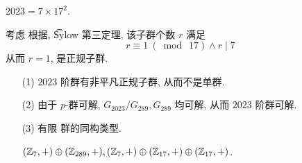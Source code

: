 \problem[题目 6]

\begin{solution}
	$2023=7\times 17^2$.

	考虑 \Sy[17] 根据, \t{Sylow} 第三定理, 该子群个数 $r$ 满足 $$r\equiv 1\ (\bmod\ 17)\wedge r\mid 7$$ 从而 $r=1$, \Sy[17] 是正规子群.

	\begin{itemize}
		\item[(1)] $2023$ 阶群有非平凡正规子群, 从而不是单群.
		\item[(2)] 由于 $p$-群可解, $G_{2023}/G_{289},G_{289}$ 均可解, 从而 $2023$ 阶群可解.
		\item[(3)] 有限 \Abel 群的同构类型.

		$(\mathbb Z_7,+)\oplus(\mathbb Z_{289},+),(\mathbb Z_7,+)\oplus(\mathbb Z_{17},+)\oplus(\mathbb Z_{17},+)$.
	\end{itemize}
\end{solution}

\problem[题目 7]


